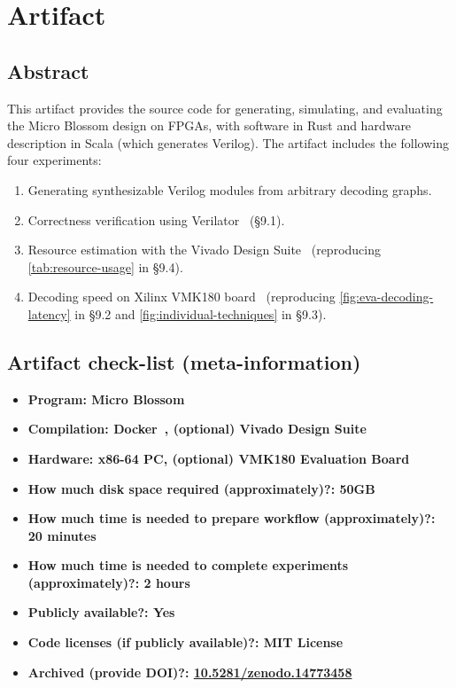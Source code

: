 \section{Artifact}

\subsection{Abstract}

This artifact provides the source code for generating, simulating, and evaluating the Micro Blossom design on FPGAs, with software in Rust and hardware description in Scala (which generates Verilog).
The artifact includes the following four experiments:
\begin{enumerate}
    \item Generating synthesizable Verilog modules from arbitrary decoding graphs.
    \item Correctness verification using Verilator~\cite{Snyder_Verilator_v5014} (\S9.1).
    \item Resource estimation with the Vivado Design Suite~\cite{vivado2023} (reproducing \autoref{tab:resource-usage} in \S9.4).
    \item Decoding speed on Xilinx VMK180 board~\cite{vmk180} (reproducing \autoref{fig:eva-decoding-latency} in \S9.2 and \autoref{fig:individual-techniques} in \S9.3).
\end{enumerate}

\subsection{Artifact check-list (meta-information)}

{\small
\begin{itemize}
  \item {\bf Program: Micro Blossom~\cite{micro-blossom}}
  \item {\bf Compilation: Docker~\cite{merkel2014docker}, (optional) Vivado Design Suite~\cite{vivado2023}}
  \item {\bf Hardware: x86-64 PC, (optional) VMK180 Evaluation Board~\cite{vmk180}}
  \item {\bf How much disk space required (approximately)?: 50GB}
  \item {\bf How much time is needed to prepare workflow (approximately)?: 20 minutes}
  \item {\bf How much time is needed to complete experiments (approximately)?: 2 hours}
  \item {\bf Publicly available?: Yes~\cite{micro-blossom}}
  \item {\bf Code licenses (if publicly available)?: MIT License}
  \item {\bf Archived (provide DOI)?: \href{https://doi.org/10.5281/zenodo.14773458}{10.5281/zenodo.14773458}}
\end{itemize}
}

